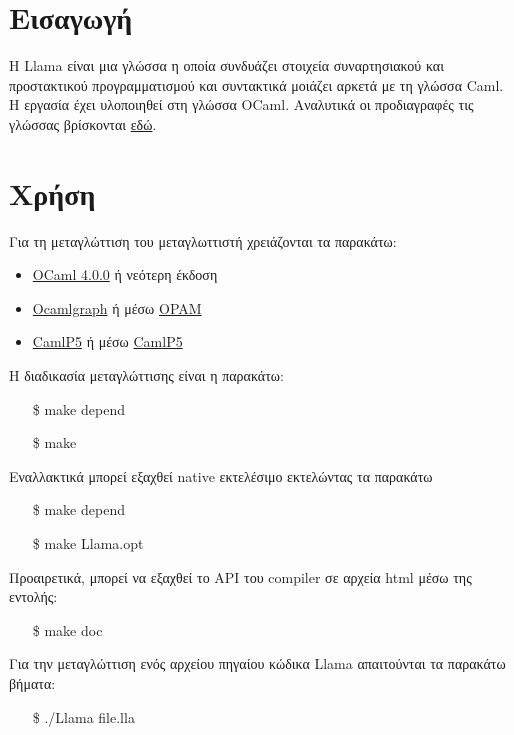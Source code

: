 \documentclass[12pt]{article}
\newcommand{\Llama}{\textsf{Llama }}
\begin{document}
\section{Εισαγωγή}
H \Llama είναι μια γλώσσα η οποία συνδυάζει στοιχεία συναρτησιακού και προστακτικού προγραμματισμού και συντακτικά μοιάζει αρκετά με τη γλώσσα Caml. Η εργασία έχει υλοποιηθεί στη γλώσσα OCaml. Αναλυτικά οι προδιαγραφές τις γλώσσας βρίσκονται \href{http://courses.softlab.ntua.gr/compilers/2012a/llama2012.pdf}{εδώ}.
\section{Χρήση}
Για τη μεταγλώττιση του μεταγλωττιστή χρειάζονται τα παρακάτω:
\begin{itemize}
\item \href{http://ocaml.org/install.html}{OCaml 4.0.0} ή νεότερη έκδοση
\item \href{http://ocamlgraph.lri.fr}{Ocamlgraph} ή μέσω \href{http://opam.ocaml.org/pkg/ocamlgraph/}{OPAM}
\item \href{http://pauillac.inria.fr/~ddr/camlp5/}{CamlP5} ή μέσω \href{http://opam.ocaml.org/pkg/camlp5}{CamlP5}
\end{itemize}

Η διαδικασία μεταγλώττισης είναι η παρακάτω:
\begin{itemize}
\item[\$] make depend
\item[\$] make
\end{itemize}

Εναλλακτικά μπορεί εξαχθεί native εκτελέσιμο εκτελώντας τα παρακάτω

\begin{itemize}
\item[\$] make depend
\item[\$] make Llama.opt
\end{itemize}

Προαιρετικά, μπορεί να εξαχθεί το API του compiler σε αρχεία html μέσω της εντολής:
\begin{itemize}
\item[\$] make doc
\end{itemize}

Για την μεταγλώττιση ενός αρχείου πηγαίου κώδικα \Llama απαιτούνται τα παρακάτω βήματα:

\begin{itemize}
\item[\$] ./Llama file.lla
\end{itemize}
\end{document}
